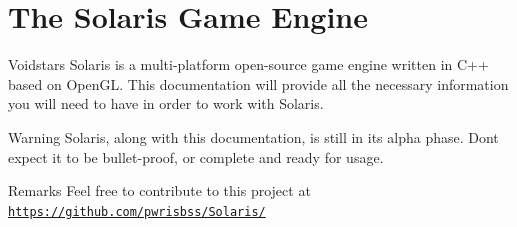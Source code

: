 \chapter{The Solaris Game Engine }
\hypertarget{index}{}\label{index}
Voidstar\textquotesingle{}s Solaris is a multi-\/platform open-\/source game engine written in C++ based on Open\+GL. This documentation will provide all the necessary information you will need to have in order to work with Solaris.

\begin{DoxyWarning}{Warning}
Solaris, along with this documentation, is still in its alpha phase. Don\textquotesingle{}t expect it to be bullet-\/proof, or complete and ready for usage.
\end{DoxyWarning}
\begin{DoxyRemark}{Remarks}
Feel free to contribute to this project at \href{https://github.com/pwrisbss/Solaris/}{\texttt{https:\+/\+/\+github.\+com/\+pwrisbss/\+\+Solaris/}} 
\end{DoxyRemark}
